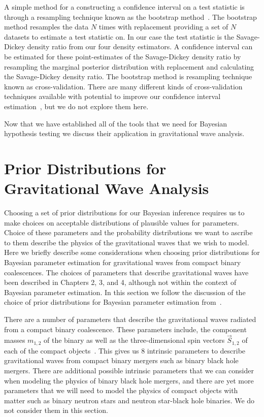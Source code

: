 A simple method for a constructing a confidence interval on a test statistic is through a resampling technique known as the bootstrap method~\cite{efron1992bootstrap}. The bootstrap method resamples the data $N$ times with replacement providing a set of $N$ datasets to estimate a test statistic on. In our case the test statistic is the Savage-Dickey density ratio from our four density estimators. A confidence interval can be estimated for these point-estimates of the Savage-Dickey density ratio by resampling the marginal posterior distribution with replacement and calculating the Savage-Dickey density ratio. The bootstrap method is resampling technique known as cross-validation. There are many different kinds of cross-validation techniques available with potential to improve our confidence interval estimation~\cite{efron1997improvements, vehtari2017practical}, but we do not explore them here.

Now that we have established all of the tools that we need for Bayesian hypothesis testing we discuss their application in gravitational wave analysis.

\section{Prior Distributions for Gravitational Wave Analysis}
Choosing a set of prior distributions for our Bayesian inference requires
us to make choices on acceptable distributions of plausible values for parameters.
Choice of these parameters and the probability distributions we want to ascribe
to them 
describe the physics of the gravitational waves 
that we wish to model. Here we briefly describe some considerations when choosing
prior distributions for Bayesian parameter estimation
for gravitational waves from compact binary coalescences. The choices of parameters
that describe gravitational waves have been described in Chapters 2, 3, and 4, although
not within the context of Bayesian parameter estimation. In this section we
follow the discussion of the choice of prior distributions for Bayesian parameter
estimation from~\cite{biwer2019pycbc}. 

There are a number of parameters that describe the gravitational waves
radiated from a compact binary coalescence. These parameters
include, the component masses $m_{1,2}$ of the binary as well as the three-dimensional spin vectors
$\vec{S}_{1,2}$ of each of the compact objects~\cite{Hawking:1987en}. This gives us
$8$ intrinsic parameters to describe gravitational waves from compact binary mergers
such as binary black hole mergers.
There are additional possible intrinsic
parameters that we can consider when modeling the physics of binary black hole mergers,
and there are yet more parameters that we will need to model the physics of compact objects
with matter such as binary neutron stars and neutron star-black hole binaries. We do not
consider them in this section.

